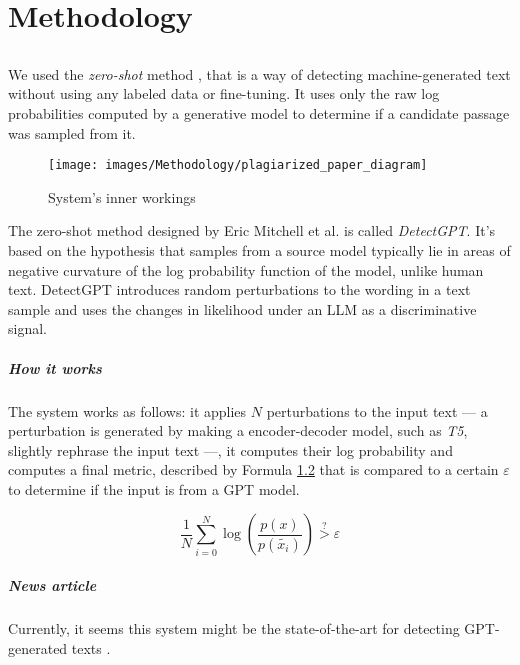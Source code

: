 \chapter{Methodology}

\section{}

We used the \textit{zero-shot} method \cite{mitchell2023detectgpt}, that is  a way of detecting machine-generated text without using any labeled data or fine-tuning. It uses only the raw log probabilities computed by a generative model to determine if a candidate passage was sampled from it.

\begin{figure}[H]
	\centering
	\texttt{[image: images/Methodology/plagiarized\_paper\_diagram]}
	\caption{System's inner workings}
	\label{fig:plagiarizedpaperdiagram}
\end{figure}

The zero-shot method designed by Eric Mitchell et al. is called \textit{DetectGPT}. It's based on the hypothesis that samples from a source model typically lie in areas of negative curvature of the log probability function of the model, unlike human text. DetectGPT introduces random perturbations to the wording in a text sample and uses the changes in likelihood under an LLM as a discriminative signal.

\paragraph{How it works}
The system works as follows: it applies $N$ perturbations to the input text --- a perturbation is generated by making a encoder-decoder model, such as \textit{T5}, slightly rephrase the input text ---, it computes their log probability and computes a final metric, described by Formula \ref{formula:logprobmetric} that is compared to a certain $\varepsilon$ to determine if the input is from a GPT model.

\begin{figure}[H]
	\centering
	\label{formula:logprobmetric}
	\begin{equation}
		\dfrac{1}{N} \sum_{i = 0}^{N}
		\log\left(
		\dfrac{p(x)}{p(\tilde{x_i})}
		\right)
		\stackrel{?}{>}
		\varepsilon
	\end{equation}
\end{figure}

\paragraph{News article}
Currently, it seems this system might be the state-of-the-art for detecting GPT-generated texts \cite{state-of-the-art-article}.

